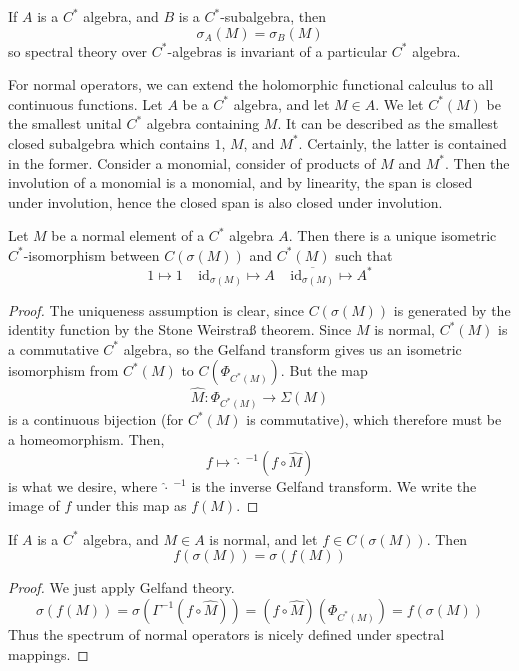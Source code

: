 \begin{corollary}
    If $A$ is a $C^*$ algebra, and $B$ is a $C^*$-subalgebra, then 
    \[ \sigma_A(M) = \sigma_B(M) \]
    so spectral theory over $C^*$-algebras is invariant of a particular $C^*$ algebra.
\end{corollary}

For normal operators, we can extend the holomorphic functional calculus to all continuous functions. Let $A$ be a $C^*$ algebra, and let $M \in A$. We let $C^*(M)$ be the smallest unital $C^*$ algebra containing $M$. It can be described as the smallest closed subalgebra which contains $1$, $M$, and $M^*$. Certainly, the latter is contained in the former. Consider a monomial, consider of products of $M$ and $M^*$. Then the involution of a monomial is a monomial, and by linearity, the span is closed under involution, hence the closed span is also closed under involution.

\begin{theorem}
    Let $M$ be a normal element of a $C^*$ algebra $A$. Then there is a unique isometric $C^*$-isomorphism between $C(\sigma(M))$ and $C^*(M)$ such that
    \[ 1 \mapsto 1\ \ \ \ \ \text{id}_{\sigma(M)} \mapsto A\ \ \ \ \ \overline{\text{id}_{\sigma(M)}} \mapsto A^* \]
\end{theorem}
\begin{proof}
    The uniqueness assumption is clear, since $C(\sigma(M))$ is generated by the identity function by the Stone Weirstra{\ss} theorem. Since $M$ is normal, $C^*(M)$ is a commutative $C^*$ algebra, so the Gelfand transform gives us an isometric isomorphism from $C^*(M)$ to $C(\Phi_{C^*(M)})$. But the map
    \[ \widehat{M}: \Phi_{C^*(M)} \to \Sigma(M) \]
    is a continuous bijection (for $C^*(M)$ is commutative), which therefore must be a homeomorphism. Then,
    \[ f \mapsto \widehat{\cdot}\ ^{-1}(f \circ \widehat{M}) \]
    is what we desire, where $\widehat{\cdot}\ ^{-1}$ is the inverse Gelfand transform.  We write the image of $f$ under this map as $f(M)$.
\end{proof}

\begin{corollary}
    If $A$ is a $C^*$ algebra, and $M \in A$ is normal, and let $f \in C(\sigma(M))$. Then
    \[ f(\sigma(M)) = \sigma(f(M)) \]
\end{corollary}
\begin{proof}
    We just apply Gelfand theory.
    \[ \sigma(f(M)) = \sigma(\Gamma^{-1}(f \circ \widehat{M})) = (f \circ \widehat{M})(\Phi_{C^*(M)}) = f(\sigma(M)) \]
    Thus the spectrum of normal operators is nicely defined under spectral mappings.
\end{proof}

